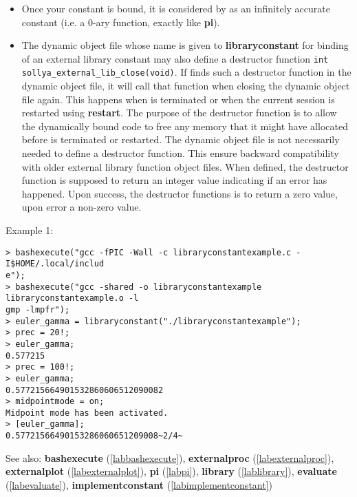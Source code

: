 \begin{itemize}
\item Once your constant is bound, it is considered by \sollya as an infinitely
   accurate constant (i.e. a 0-ary function, exactly like \textbf{pi}).

\item The dynamic object file whose name is given to \textbf{libraryconstant} for binding of an
   external library constant may also define a destructor function \verb|int sollya_external_lib_close(void)|.
   If \sollya finds such a destructor function in the dynamic object file, it will call 
   that function when closing the dynamic object file again. This happens when \sollya
   is terminated or when the current \sollya session is restarted using \textbf{restart}.
   The purpose of the destructor function is to allow the dynamically bound code
   to free any memory that it might have allocated before \sollya is terminated 
   or restarted. 
   The dynamic object file is not necessarily needed to define a destructor
   function. This ensure backward compatibility with older \sollya external 
   library function object files.
   When defined, the destructor function is supposed to return an integer
   value indicating if an error has happened. Upon success, the destructor
   functions is to return a zero value, upon error a non-zero value.
\end{itemize}
\noindent Example 1: 
\begin{center}\begin{minipage}{15cm}\begin{Verbatim}[frame=single,commandchars=\\\|\~]
> bashexecute("gcc -fPIC -Wall -c libraryconstantexample.c -I$HOME/.local/includ
e");
> bashexecute("gcc -shared -o libraryconstantexample libraryconstantexample.o -l
gmp -lmpfr");
> euler_gamma = libraryconstant("./libraryconstantexample");
> prec = 20!;
> euler_gamma;
0.577215
> prec = 100!;
> euler_gamma;
0.577215664901532860606512090082
> midpointmode = on;
Midpoint mode has been activated.
> [euler_gamma];
0.57721566490153286060651209008~2/4~
\end{Verbatim}
\end{minipage}\end{center}
See also: \textbf{bashexecute} (\ref{labbashexecute}), \textbf{externalproc} (\ref{labexternalproc}), \textbf{externalplot} (\ref{labexternalplot}), \textbf{pi} (\ref{labpi}), \textbf{library} (\ref{lablibrary}), \textbf{evaluate} (\ref{labevaluate}), \textbf{implementconstant} (\ref{labimplementconstant})
